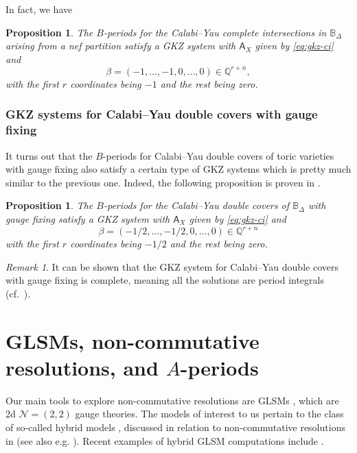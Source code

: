 \documentclass[12pt,a4paper,oneside]{amsart}
\numberwithin{equation}{section}
\newtheorem{prop}[thm]{Proposition}
\theoremstyle{definition}
\theoremstyle{remark}
\newtheorem{rmk}[thm]{Remark}
\begin{document}
In fact, we have
\begin{prop}
The \(B\)-periods for the Calabi--Yau complete intersections 
in \(\mathbb{B}_{\Delta}\) arising from
a nef partition satisfy a GKZ system
with 
\(\mathsf{A}_{X}\) given by \eqref{eq:gkz-ci} and 
\begin{equation*}
    \beta = (-1,\ldots,-1,0,\ldots,0)\in\mathbb{Q}^{r+n} ,
\end{equation*}
with the first \(r\) coordinates being \(-1\) and the rest being zero.
\end{prop}

\subsubsection{GKZ systems for Calabi--Yau double covers with gauge fixing}
\label{sec:GKZnc}
It turns out that the \(B\)-periods for Calabi--Yau double covers 
of toric varieties with gauge fixing also 
satisfy a certain type of GKZ systems which is pretty 
much similar to the previous one.
Indeed, the following proposition is proven in \cite{Lee:2020oyt}.
\begin{prop}
The \(B\)-periods for the Calabi--Yau
double covers of \(\mathbb{B}_{\Delta}\) with gauge fixing
satisfy a GKZ system with 
\(\mathsf{A}_{X}\) given by \eqref{eq:gkz-ci} and 
\begin{equation*}
    \beta = (-1/2,\ldots,-1/2,0,\ldots,0)\in\mathbb{Q}^{r+n}
\end{equation*}
with the first \(r\) coordinates being \(-1/2\) and the rest being zero.
\end{prop}

\begin{rmk}
    It can be shown that the GKZ system for Calabi--Yau double covers
    with gauge fixing is complete,
    meaning all the solutions are period integrals 
    (cf.~\cite{2023-Lee-period-CYFCI}).
\end{rmk}






\section{GLSMs, non-commutative resolutions, and \texorpdfstring{$A$}{A}-periods}
\label{sec:GLSM}
Our main tools to explore non-commutative resolutions are GLSMs \cite{Witten:1993yc}, which are 2d $\mathcal{N}=(2,2)$ gauge theories. The models of interest to us pertain to the class of so-called hybrid models \cite{Bertolini:2013xga}, discussed in relation to non-commutative resolutions in \cite{Caldararu:2010ljp} (see also e.g. \cite{Sharpe:2012ji,Sharpe:2013bwa}). Recent examples of hybrid GLSM computations include \cite{Erkinger:2020cjt,Erkinger:2022sqs,Katz:2022lyl,Katz:2023zan,Knapp:2024wwh,Knapp:2025hnf}.\par
\end{document}
